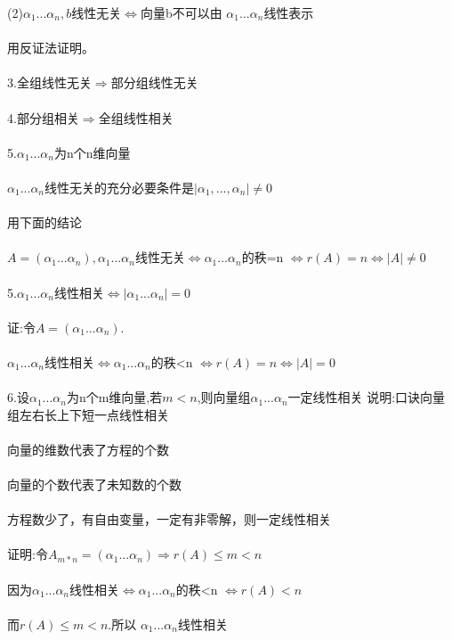 \documentclass[a4paper,fleqn]{article}
\begin{document}
(2)$\alpha_1...\alpha_n,b$线性无关$\Leftrightarrow $向量b不可以由 $\alpha_1...\alpha_n$线性表示 \\ \\
用反证法证明。\\ \\
3.全组线性无关$\Rightarrow$部分组线性无关 \\ \\
4.部分组相关$\Rightarrow$全组线性相关\\ \\
5.$\alpha_1...\alpha_n$为n个n维向量 \\ \\
$\alpha_1...\alpha_n$线性无关的充分必要条件是$|\alpha_1,...,\alpha_n|\neq 0$\\ \\
用下面的结论 \\ \\
$A=(\alpha_1...\alpha_n),\alpha_1...\alpha_n$线性无关$\Leftrightarrow$$\alpha_1...\alpha_n$的秩=n $\Leftrightarrow r(A)=n \Leftrightarrow |A|\neq 0$ \\ \\
5.$\alpha_1...\alpha_n$线性相关$\Leftrightarrow|\alpha_1...\alpha_n|=0$ \\ \\
证:令$A=(\alpha_1...\alpha_n)$.\\ \\
$\alpha_1...\alpha_n$线性相关$\Leftrightarrow \alpha_1...\alpha_n $的秩<n $\Leftrightarrow r(A)=n \Leftrightarrow |A| = 0$ \\ \\
6.设$\alpha_1...\alpha_n$为n个m维向量,若$m<n$,则向量组$\alpha_1...\alpha_n$一定线性相关
说明:口诀向量组左右长上下短一点线性相关\\ \\
向量的维数代表了方程的个数 \\ \\
向量的个数代表了未知数的个数 \\ \\
方程数少了，有自由变量，一定有非零解，则一定线性相关 \\ \\
证明:令$A_{m*n}=(\alpha_1...\alpha_n) \Rightarrow r(A) \leq m < n$\\ \\ 
因为$\alpha_1...\alpha_n$线性相关$\Leftrightarrow \alpha_1...\alpha_n$的秩<n  $\Leftrightarrow r(A)<n$ \\ \\
而$r(A)\leq m<n.$所以 $\alpha_1...\alpha_n$线性相关
\end{document}
